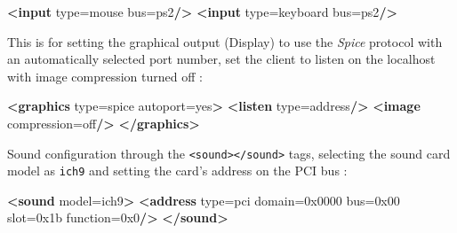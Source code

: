 \documentclass[
  14pt,
  english,
  a4paper,
]{scrreprt}
\newenvironment{Shaded}{}{}
\newcommand{\KeywordTok}[1]{\textcolor[rgb]{0.00,0.44,0.13}{\textbf{#1}}}
\newcommand{\OtherTok}[1]{\textcolor[rgb]{0.00,0.44,0.13}{#1}}
\newcommand{\StringTok}[1]{\textcolor[rgb]{0.25,0.44,0.63}{#1}}
\begin{document}
\begin{Shaded}
\begin{Highlighting}[]
\KeywordTok{\textless{}input}\OtherTok{ type=}\StringTok{\textquotesingle{}mouse\textquotesingle{}}\OtherTok{ bus=}\StringTok{\textquotesingle{}ps2\textquotesingle{}}\KeywordTok{/\textgreater{}}
\KeywordTok{\textless{}input}\OtherTok{ type=}\StringTok{\textquotesingle{}keyboard\textquotesingle{}}\OtherTok{ bus=}\StringTok{\textquotesingle{}ps2\textquotesingle{}}\KeywordTok{/\textgreater{}}
\end{Highlighting}
\end{Shaded}

This is for setting the graphical output (Display) to use the
\emph{Spice} protocol with an automatically selected port number, set
the client to listen on the localhost with image compression turned off
:

\begin{Shaded}
\begin{Highlighting}[]
\KeywordTok{\textless{}graphics}\OtherTok{ type=}\StringTok{\textquotesingle{}spice\textquotesingle{}}\OtherTok{ autoport=}\StringTok{\textquotesingle{}yes\textquotesingle{}}\KeywordTok{\textgreater{}}
  \KeywordTok{\textless{}listen}\OtherTok{ type=}\StringTok{\textquotesingle{}address\textquotesingle{}}\KeywordTok{/\textgreater{}}
  \KeywordTok{\textless{}image}\OtherTok{ compression=}\StringTok{\textquotesingle{}off\textquotesingle{}}\KeywordTok{/\textgreater{}}
\KeywordTok{\textless{}/graphics\textgreater{}}
\end{Highlighting}
\end{Shaded}

Sound configuration through the
\texttt{\textless{}sound\textgreater{}\textless{}/sound\textgreater{}}
tags, selecting the sound card model as \texttt{ich9} and setting the
card's address on the PCI bus :

\begin{Shaded}
\begin{Highlighting}[]
\KeywordTok{\textless{}sound}\OtherTok{ model=}\StringTok{\textquotesingle{}ich9\textquotesingle{}}\KeywordTok{\textgreater{}}
  \KeywordTok{\textless{}address}\OtherTok{ type=}\StringTok{\textquotesingle{}pci\textquotesingle{}}\OtherTok{ domain=}\StringTok{\textquotesingle{}0x0000\textquotesingle{}}\OtherTok{ bus=}\StringTok{\textquotesingle{}0x00\textquotesingle{}}\OtherTok{ slot=}\StringTok{\textquotesingle{}0x1b\textquotesingle{}}\OtherTok{ function=}\StringTok{\textquotesingle{}0x0\textquotesingle{}}\KeywordTok{/\textgreater{}}
\KeywordTok{\textless{}/sound\textgreater{}}
\end{Highlighting}
\end{Shaded}
\end{document}
